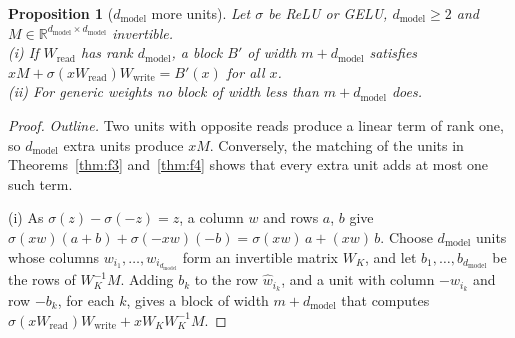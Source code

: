 \documentclass[10pt]{article}
\newtheorem{proposition}[theorem]{Proposition}
\theoremstyle{definition}
\theoremstyle{remark}
\newcommand{\R}{\mathbb{R}}
\newcommand{\Wread}{W_{\mathrm{read}}}
\newcommand{\Wwrite}{W_{\mathrm{write}}}
\newcommand{\dm}{d_{\mathrm{model}}}
\begin{document}
\begin{proposition}[$\dm$ more units]\label{prop:widthd}
Let $\sigma$ be ReLU or GELU, $\dm \ge 2$ and $M \in \R^{\dm\times\dm}$ invertible.\\
\textup{(i)} If $\Wread$ has rank $\dm$, a block $B'$ of width $m + \dm$ satisfies $xM + \sigma(x\Wread)\Wwrite = B'(x)$ for all $x$.\\
\textup{(ii)} For generic weights no block of width less than $m + \dm$ does.
\end{proposition}
\begin{proof}
\emph{Outline.} Two units with opposite reads produce a linear term of rank one, so $\dm$ extra units produce $xM$. Conversely, the matching of the units in Theorems~\ref{thm:f3} and~\ref{thm:f4} shows that every extra unit adds at most one such term.

(i) As $\sigma(z) - \sigma(-z) = z$, a column $w$ and rows $a$, $b$ give $\sigma(xw)(a + b) + \sigma(-xw)(-b) = \sigma(xw)\,a + (xw)\,b$. Choose $\dm$ units whose columns $w_{i_1}, \dots, w_{i_{\dm}}$ form an invertible matrix $W_K$, and let $b_1, \dots, b_{\dm}$ be the rows of $W_K^{-1}M$. Adding $b_k$ to the row $\hat w_{i_k}$, and a unit with column $-w_{i_k}$ and row $-b_k$, for each $k$, gives a block of width $m + \dm$ that computes $\sigma(x\Wread)\Wwrite + xW_KW_K^{-1}M$.


\end{proof}
\end{document}
